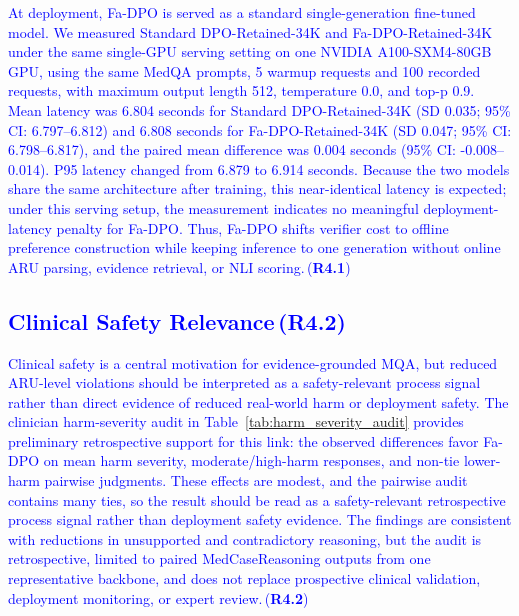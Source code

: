 \documentclass[a4paper,fleqn,doubleblind]{cas-sc}
\DeclareRobustCommand{\added}[1]{\textcolor{blue}{#1}}
\DeclareRobustCommand{\revtag}[1]{\textcolor{blue}{\scriptsize\,(\textbf{#1})}}
\begin{document}
\added{At deployment, Fa-DPO is served as a standard single-generation fine-tuned model. We measured Standard DPO-Retained-34K and Fa-DPO-Retained-34K under the same single-GPU serving setting on one NVIDIA A100-SXM4-80GB GPU, using the same MedQA prompts, 5 warmup requests and 100 recorded requests, with maximum output length 512, temperature 0.0, and top-p 0.9. Mean latency was 6.804 seconds for Standard DPO-Retained-34K (SD 0.035; 95\% CI: 6.797--6.812) and 6.808 seconds for Fa-DPO-Retained-34K (SD 0.047; 95\% CI: 6.798--6.817), and the paired mean difference was 0.004 seconds (95\% CI: -0.008--0.014). P95 latency changed from 6.879 to 6.914 seconds. Because the two models share the same architecture after training, this near-identical latency is expected; under this serving setup, the measurement indicates no meaningful deployment-latency penalty for Fa-DPO. Thus, Fa-DPO shifts verifier cost to offline preference construction while keeping inference to one generation without online ARU parsing, evidence retrieval, or NLI scoring.}\revtag{R4.1}

\subsection{\added{Clinical Safety Relevance}\revtag{R4.2}}
\added{Clinical safety is a central motivation for evidence-grounded MQA, but reduced ARU-level violations should be interpreted as a safety-relevant process signal rather than direct evidence of reduced real-world harm or deployment safety. The clinician harm-severity audit in Table~\ref{tab:harm_severity_audit} provides preliminary retrospective support for this link: the observed differences favor Fa-DPO on mean harm severity, moderate/high-harm responses, and non-tie lower-harm pairwise judgments. These effects are modest, and the pairwise audit contains many ties, so the result should be read as a safety-relevant retrospective process signal rather than deployment safety evidence. The findings are consistent with reductions in unsupported and contradictory reasoning, but the audit is retrospective, limited to paired MedCaseReasoning outputs from one representative backbone, and does not replace prospective clinical validation, deployment monitoring, or expert review.}\revtag{R4.2}
\end{document}
